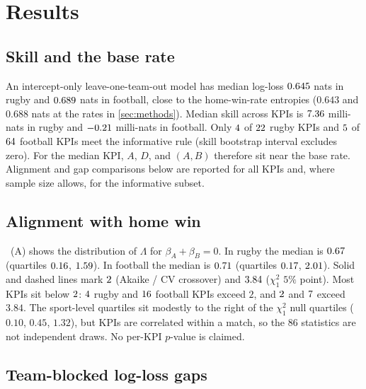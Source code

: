 \section{Results}
\label{sec:results}

\subsection{Skill and the base rate}
\label{sec:skill}

An intercept-only leave-one-team-out model has median log-loss $0.645$ nats in rugby and $0.689$ nats in football, close to the home-win-rate entropies ($0.643$ and $0.688$ nats at the rates in \cref{sec:methods}).
Median skill across KPIs is $7.36$ milli-nats in rugby and $-0.21$ milli-nats in football.
Only $4$ of $22$ rugby KPIs and $5$ of $64$ football KPIs meet the informative rule (skill bootstrap interval excludes zero).
For the median KPI, $A$, $D$, and $(A,B)$ therefore sit near the base rate.
Alignment and gap comparisons below are reported for all KPIs and, where sample size allows, for the informative subset.

\subsection{Alignment with home win}
\label{sec:alignment}

~(A) shows the distribution of $\Lambda$ for $\beta_A+\beta_B=0$.
In rugby the median is $0.67$ (quartiles $0.16$, $1.59$).
In football the median is $0.71$ (quartiles $0.17$, $2.01$).
Solid and dashed lines mark $2$ (Akaike / CV crossover) and $3.84$ ($\chi^2_1$ $5\%$ point).
Most KPIs sit below $2$: $4$ rugby and $16$ football KPIs exceed $2$, and $2$ and $7$ exceed $3.84$.
The sport-level quartiles sit modestly to the right of the $\chi^2_1$ null quartiles ($0.10$, $0.45$, $1.32$), but KPIs are correlated within a match, so the $86$ statistics are not independent draws.
No per-KPI $p$-value is claimed.

\subsection{Team-blocked log-loss gaps}
\label{sec:gaps}

